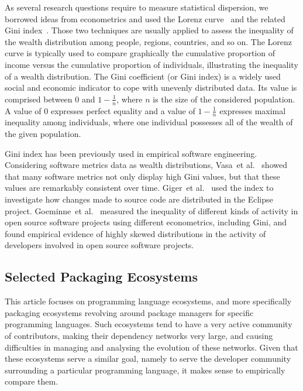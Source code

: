 \documentclass[smallextended]{svjour3}       %
\newcommand{\etal}{et al.\xspace}
\begin{document}
\bigskip

As several research questions require to measure statistical dispersion, we borrowed ideas from econometrics and used the Lorenz curve~\cite{doi:10.1080/15225437.1905.10503443} and the related Gini index~\cite{Gini1912}. 
Those two techniques are usually applied to assess the inequality of the wealth distribution among people, regions, countries, and so on. 
The Lorenz curve is typically used to compare graphically the cumulative proportion of income versus the cumulative proportion of individuals, illustrating the inequality of a wealth distribution. 
The Gini coefficient (or Gini index) is a widely used social and economic indicator to cope with unevenly distributed data. 
Its value is comprised between 0 and $1 - \frac{1}{n}$, where $n$ is the size of the considered population.
A value of 0 expresses perfect equality and a value of $1 - \frac{1}{n}$ expresses maximal inequality among individuals, where one individual possesses all of the wealth of the given population.

Gini index has been previously used in empirical software engineering. 
Considering software metrics data as wealth distributions, Vasa~\etal~\cite{Vasa2009Gini} showed that many software metrics not only display high Gini values, but that these values are remarkably consistent over time. 
Giger~\etal~\cite{Giger2011} used the index to investigate how changes made to source code are distributed in the \textsf{Eclipse} project.
Goeminne~\etal~\cite{Goeminne2011-SQM} measured the inequality of different kinds of activity in open source software projects using different econometrics, including Gini, and found empirical evidence of highly skewed distributions in the activity of developers involved in open source software projects.



\subsection{Selected Packaging Ecosystems}

This article focuses on programming language ecosystems, and more specifically packaging ecosystems revolving around package managers for specific programming languages. Such ecosystems tend to have a very active community of contributors, making their dependency networks very large, and causing difficulties in managing and analysing the evolution of these networks.
Given that these ecosystems serve a similar goal, namely to serve the developer community surrounding a particular programming language, it makes sense to empirically compare them.
\end{document}
